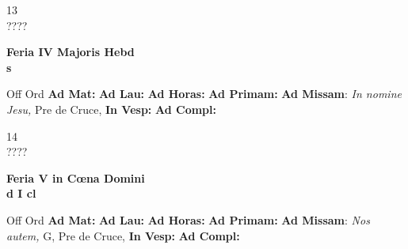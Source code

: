 \documentclass[10pt, openany]{book}
\begin{document}
    \begin{center}
        \begin{minipage}{3.5in}
            \vspace{2em}
            \begin{minipage}{0.5in}
                {\Huge 13} \\
                {\normalsize ????}
            \end{minipage}
            \begin{minipage}{3.0in}
                \textbf{ \large Feria IV Majoris Hebd \\
                \textnormal{\normalsize s}}

            \end{minipage}
            \begin{justify}Off Ord
                \textbf{Ad Mat: }
                \textbf{Ad Lau: }
                \textbf{Ad Horas: }
                \textbf{Ad Primam: }\textbf{Ad Missam}: \textit{In nomine Jesu,} Pre de Cruce, 
                \textbf{In Vesp: }
                \textbf{Ad Compl: }
            \end{justify}
        \end{minipage}
    \end{center}

    \begin{center}
        \begin{minipage}{3.5in}
            \vspace{2em}
            \begin{minipage}{0.5in}
                {\Huge 14} \\
                {\normalsize ????}
            \end{minipage}
            \begin{minipage}{3.0in}
                \textbf{ \large Feria V in Cœna Domini \\
                \textnormal{\normalsize d I cl}}

            \end{minipage}
            \begin{justify}Off Ord
                \textbf{Ad Mat: }
                \textbf{Ad Lau: }
                \textbf{Ad Horas: }
                \textbf{Ad Primam: }\textbf{Ad Missam}: \textit{Nos autem,} G, Pre de Cruce, 
                \textbf{In Vesp: }
                \textbf{Ad Compl: }
            \end{justify}
        \end{minipage}
    \end{center}
\end{document}
